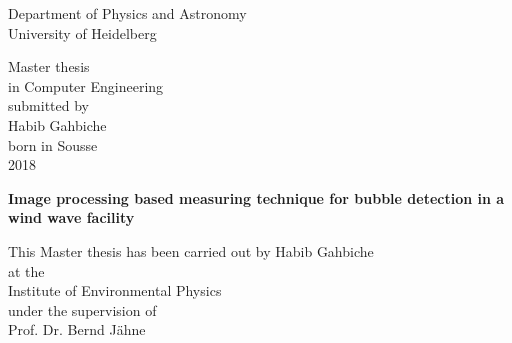 
\thispagestyle{empty}
\begin{center}
  \renewcommand{\baselinestretch}{2.00}
  \Large\sffamily
  Department of Physics and Astronomy\\
  \large University of Heidelberg
  \par\vfill\normalfont
  Master thesis\\
  in Computer Engineering\\
  submitted by\\
  Habib Gahbiche\\
  born in Sousse\\
  2018
\end{center}
\newpage

\thispagestyle{empty}
\begin{center}
  \renewcommand{\baselinestretch}{2.00}
  \Large\bfseries\sffamily
    Image processing based measuring technique for bubble detection in a wind wave facility \\
  \par
  \vfill
  \large\normalfont
  This Master thesis has been carried out by Habib Gahbiche\\
  at the\\
  Institute of Environmental Physics\\
  under the supervision of\\
  Prof. Dr. Bernd Jähne\\
\end{center}\par
\vspace{5\baselineskip}

\renewcommand{\baselinestretch}{1.00}\normalsize